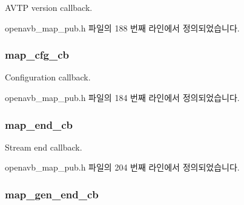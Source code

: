 A\+V\+TP version callback. 



openavb\+\_\+map\+\_\+pub.\+h 파일의 188 번째 라인에서 정의되었습니다.

\subsubsection[{\texorpdfstring{map\+\_\+cfg\+\_\+cb}{map_cfg_cb}}]{ map\+\_\+cfg\+\_\+cb}\hypertarget{structopenavb__map__cb__t_aa88869f419f2830bcbfe2646b0efb2fc}{}\label{structopenavb__map__cb__t_aa88869f419f2830bcbfe2646b0efb2fc}


Configuration callback. 



openavb\+\_\+map\+\_\+pub.\+h 파일의 184 번째 라인에서 정의되었습니다.

\subsubsection[{\texorpdfstring{map\+\_\+end\+\_\+cb}{map_end_cb}}]{ map\+\_\+end\+\_\+cb}\hypertarget{structopenavb__map__cb__t_ace0872ff88cbd5e79bdc4cf223f68421}{}\label{structopenavb__map__cb__t_ace0872ff88cbd5e79bdc4cf223f68421}


Stream end callback. 



openavb\+\_\+map\+\_\+pub.\+h 파일의 204 번째 라인에서 정의되었습니다.

\subsubsection[{\texorpdfstring{map\+\_\+gen\+\_\+end\+\_\+cb}{map_gen_end_cb}}]{ map\+\_\+gen\+\_\+end\+\_\+cb}\hypertarget{structopenavb__map__cb__t_aefd70fa9d3e6cd61a4b7f1272a1eedcd}{}\label{structopenavb__map__cb__t_aefd70fa9d3e6cd61a4b7f1272a1eedcd}


